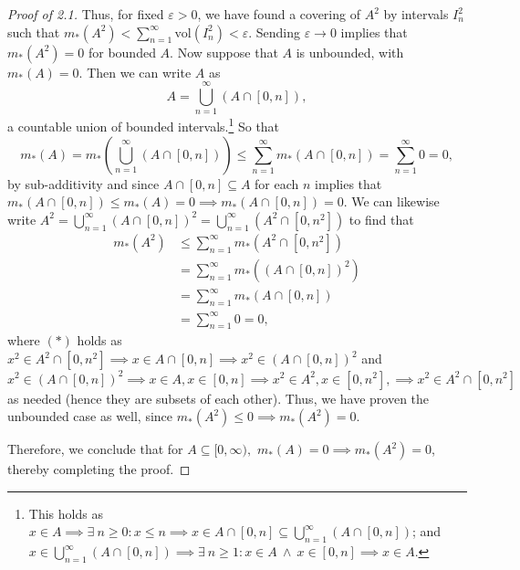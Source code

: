 \begin{proof}[Proof of 2.1]
Thus, for fixed \( \varepsilon > 0 \), we have found a covering of \( A^{2}  \) by intervals \( I_n^{2}  \) such that \(m_*(A^{2} ) <   \sum_{n=1}^{\infty} \mbox{vol}(I_n^{2} ) < \varepsilon  \). Sending \( \varepsilon \to 0 \) implies that \( m_*(A^{2} ) = 0\) for bounded \( A \). Now suppose that \( A \) is unbounded, with \( m_*(A) = 0. \) Then we can write \( A \) as \[A = \bigcup_{n=1}^{\infty} (A \cap [0, n]),\] a countable union of bounded intervals.\footnote{This holds as \( x \in A \implies \exists \ n \geq 0 : x \leq n \implies x \in A \cap [0,n] \subseteq \bigcup_{n=1}^{\infty} (A \cap [0,n] )\); and \(x \in \bigcup_{n=1}^{\infty} (A\cap [0,n]) \implies \exists \ n \geq 1 : x \in A \ \land \ x \in [0, n] \implies x \in A.\)} So that \[ m_*(A) = m_*( \bigcup_{n=1}^{\infty} (A \cap [0, n])) \leq \sum_{n=1}^{\infty}m_*(A \cap [0,n]) = \sum_{n=1}^{\infty} 0 = 0,  \] by sub-additivity and since \( A \cap [0,n] \subseteq A \) for each \( n \) implies that \( m_*(A \cap [0,n]) \leq m_*(A) = 0 \implies m_*(A \cap [0,n]) = 0.  \) We can likewise write \( A^{2} = \bigcup_{n=1}^{\infty} (A \cap [0,n])^{2} = \bigcup_{n=1}^{\infty} (A^{2} \cap [0,n^{2} ] )   \) to find that
\begin{align*}
	m_*(A^{2} )  &\leq \sum_{n=1}^{\infty} m_*(A^{2} \cap [0,n^{2}] ) \tag{applying same argument as above} \\	
		     &= \sum_{n=1}^{\infty}m_*((A \cap [0,n])^{2} ) \tag{\(\ast\)} \\
		     &= \sum_{n=1}^{\infty}m_*(A \cap [0,n]) \tag{by boundedness} \\
		     &= \sum_{n=1}^{\infty}0 = 0 \tag{By monotonicty, as argued above},
\end{align*}
where \((\ast)\) holds as \( x^{2} \in A^{2} \cap [0,n^{2} ] \implies x \in A \cap [0,n] \implies x^{2}  \in (A \cap [0,n])^{2}    \) and \( x^{2}  \in (A \cap [0,n])^{2} \implies x \in A, x \in [0,n] \implies x^{2}  \in A^{2}, x\in [0, n^{2}] , \implies x^{2} \in A^{2} \cap [0,n^{2}]       \) as needed (hence they are subsets of each other). Thus, we have proven the unbounded case as well, since \( m_*(A^{2}) \leq 0 \implies m_*(A^{2} ) = 0. \) 

Therefore, we conclude that for \( A \subseteq [0, \infty), \) \( m_*(A) = 0 \implies m_*(A^{2} ) = 0  \), thereby completing the proof.

\end{proof}
